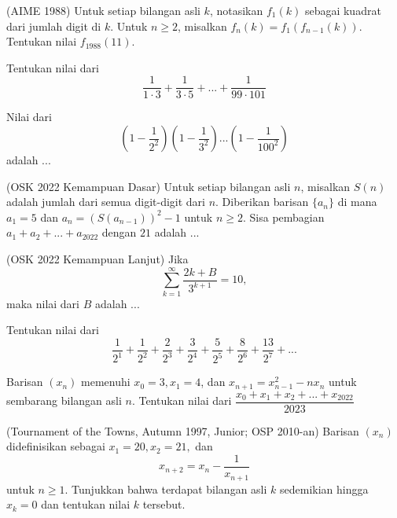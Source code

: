 \documentclass[11pt]{scrartcl}
\begin{document}
\begin{problem}
    (AIME 1988) Untuk setiap bilangan asli $k$, notasikan $f_1(k)$ sebagai kuadrat dari jumlah digit di $k$. Untuk $n \geq 2$, misalkan $f_n(k) = f_1(f_{n - 1}(k))$. Tentukan nilai $f_{1988}(11)$.
\end{problem}

\begin{problem}
    Tentukan nilai dari \[\dfrac{1}{1\cdot 3} + \dfrac{1}{3 \cdot 5} + ... + \dfrac{1}{99\cdot 101}\]
\end{problem}

\begin{problem}
    Nilai dari \[\left(1 - \dfrac{1}{2^2}\right)\left(1 - \dfrac{1}{3^2}\right)...\left(1 - \dfrac{1}{100^2}\right)\] adalah ...
\end{problem}

\begin{problem}
    (OSK 2022 Kemampuan Dasar) Untuk setiap bilangan asli $n$, misalkan $S(n)$ adalah jumlah dari semua digit-digit dari $n$. Diberikan barisan $\{a_n\}$ di mana $a_1 = 5$ dan $a_n = \left(S\left(a_{n-1}\right)\right)^2 - 1$ untuk $n \geq 2$. Sisa pembagian $a_1 + a_2 + ... + a_{2022}$ dengan $21$ adalah ...
\end{problem}

\begin{problem}
    (OSK 2022 Kemampuan Lanjut) Jika \[\sum_{k = 1}^{\infty} \dfrac{2k + B}{3^{k + 1}} = 10, \]
    maka nilai dari $B$ adalah ...
\end{problem}

\begin{problem}
    Tentukan nilai dari \[\dfrac{1}{2^1} + \dfrac{1}{2^2} + \dfrac{2}{2^3} + \dfrac{3}{2^4} + \dfrac{5}{2^5} + \dfrac{8}{2^6} + \dfrac{13}{2^7} + ...\]
\end{problem}

\begin{problem}
    Barisan $(x_n)$ memenuhi $x_0=3,x_1=4$, dan $x_{n+1}=x_{n-1}^2-nx_n$ untuk sembarang bilangan asli $n$. Tentukan nilai dari $\dfrac{x_0+x_1+x_2+...+x_{2022}}{2023}$
\end{problem}

\begin{problem}
    (Tournament of the Towns, Autumn 1997, Junior; OSP 2010-an) Barisan $(x_n)$ didefinisikan sebagai $x_1 = 20, x_2 = 21,$ dan \[x_{n+2} = x_n - \frac{1}{x_{n+1}}\] untuk $n\geq 1$. Tunjukkan bahwa terdapat bilangan asli $k$ sedemikian hingga $x_k = 0$ dan tentukan nilai $k$ tersebut. 
\end{problem}
\end{document}
